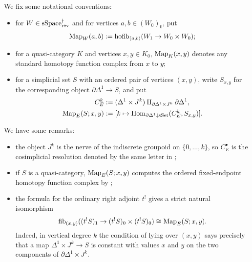 \documentclass[a4paper,dvipdfmx,11pt]{amsart}
\begin{document}
\begin{notation}\label{jt.not.Vred}
  We fix some notational conventions:
  \begin{itemize}
    \item for $W \in \mathrm{sSpace}^{\dag}_{\mathrm{rev}}$ and for vertices $a,b\in(W_0)_0$, put 
    \begin{align}
      \operatorname{Map}_W(a,b):=\mathrm{hofib}_{(a,b)}(W_1\to W_0\times W_0);
    \end{align}
    \item for a quasi-category $K$ and vertices $x,y\in K_0$, $\operatorname{Map}_K(x,y)$ denotes any standard homotopy function complex from $x$ to $y$;
    \item for a simplicial set $S$ with an ordered pair of vertices $(x,y)$, write $S_{x,y}$ for the corresponding object $\partial\Delta^1\to S$, and put 
    \begin{align}
      C_E^k
      &:=(\Delta^1\times J^k)\amalg_{\partial\Delta^1\times J^k}\partial\Delta^1,\\
      \operatorname{Map}_E(S;x,y)
      &:=[k \mapsto \operatorname{Hom}_{\partial\Delta^1\mathbin{\downarrow}\mathrm{sSet}}(C_E^k,S_{x,y})].
    \end{align}
  \end{itemize}
\end{notation}

\begin{remark}\label{jt.not.ordered-mapping}
  We have some remarks:
  \begin{itemize}
    \item the object $J^k$ is the nerve of the indiscrete groupoid on $\{0,\ldots,k\}$, so $C_E^\bullet$ is the cosimplicial resolution denoted by the same letter in \cite[Proposition~4.5 (d)]{DS11};
    \item if $S$ is a quasi-category, $\operatorname{Map}_E(S;x,y)$ computes the ordered fixed-endpoint homotopy function complex by \cite[Corollary~4.8]{DS11};
    \item the formula for the ordinary right adjoint $t^!$ gives a strict natural isomorphism
    \begin{align}
      \mathrm{fib}_{(x,y)}
      ((t^!S)_1\to(t^!S)_0\times(t^!S)_0)
      \cong
      \operatorname{Map}_E(S;x,y).
    \end{align}
    Indeed, in vertical degree $k$ the condition of lying over $(x,y)$ says precisely that a map $\Delta^1\times J^k\to S$ is constant with values $x$ and $y$ on the two components of $\partial\Delta^1\times J^k$.
  \end{itemize}
\end{remark}
\end{document}
